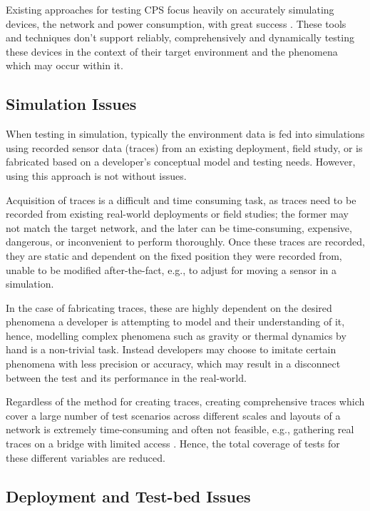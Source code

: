 Existing approaches for testing CPS focus heavily on accurately simulating devices, the network and power consumption, with great success \cite{cooja, tossim}. These tools and techniques don't support reliably, comprehensively and dynamically testing these devices in the context of their target environment and the phenomena which may occur within it. 

\subsection{Simulation Issues} %
\label{ssub:simulation_issues}

When testing in simulation, typically the environment data is fed into simulations using recorded sensor data (traces) from an existing deployment, field study\cite{bridge,Gaglione2018}, or is fabricated based on a developer's conceptual model and testing needs. However, using this approach is not without issues.

Acquisition of traces is a difficult and time consuming task, as traces need to be recorded from existing real-world deployments or field studies; the former may not match the target network, and the later can be time-consuming, expensive, dangerous, or inconvenient to perform thoroughly. Once these traces are recorded, they are static and dependent on the fixed position they were recorded from, unable to be modified after-the-fact, e.g., to adjust for moving a sensor in a simulation.

In the case of fabricating traces, these are highly dependent on the desired phenomena a developer is attempting to model and their understanding of it, hence, modelling complex phenomena such as gravity or thermal dynamics by hand is a non-trivial task. Instead developers may choose to imitate certain phenomena with less precision or accuracy, which may result in a disconnect between the test and its performance in the real-world.

Regardless of the method for creating traces, creating comprehensive traces which cover a large number of test scenarios across different scales and layouts of a network is extremely time-consuming and often not feasible, e.g., gathering real traces on a bridge with limited access \cite{Gaglione2018}. Hence, the total coverage of tests for these different variables are reduced.

\subsection{Deployment and Test-bed Issues} %
\label{ssub:deployment_and_test_bed_issues}

